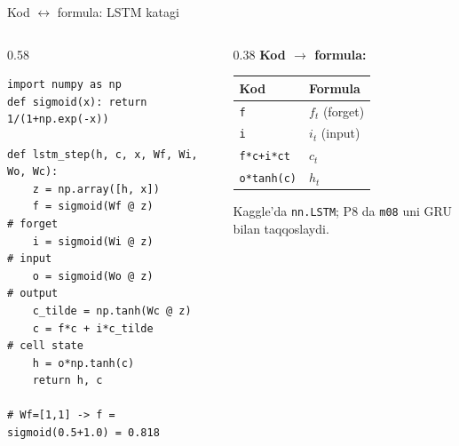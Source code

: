 \documentclass[aspectratio=169,11pt]{beamer}
\begin{document}
\begin{frame}[fragile]{Kod $\leftrightarrow$ formula: LSTM katagi}
  \begin{columns}[T]
    \begin{column}{0.58\textwidth}
\begin{lstlisting}
import numpy as np
def sigmoid(x): return 1/(1+np.exp(-x))

def lstm_step(h, c, x, Wf, Wi, Wo, Wc):
    z = np.array([h, x])
    f = sigmoid(Wf @ z)            # forget
    i = sigmoid(Wi @ z)            # input
    o = sigmoid(Wo @ z)            # output
    c_tilde = np.tanh(Wc @ z)
    c = f*c + i*c_tilde            # cell state
    h = o*np.tanh(c)
    return h, c

# Wf=[1,1] -> f = sigmoid(0.5+1.0) = 0.818
\end{lstlisting}
    \end{column}
    \begin{column}{0.38\textwidth}
      \textbf{Kod $\to$ formula:}\\[3pt]
      \footnotesize
      \begin{tabular}{p{1.6cm}p{2.0cm}}
        \toprule
        Kod & Formula \\
        \midrule
        \texttt{f} & $f_t$ (forget) \\
        \texttt{i} & $i_t$ (input) \\
        \texttt{f*c+i*ct} & $c_t$ \\
        \texttt{o*tanh(c)} & $h_t$ \\
        \bottomrule
      \end{tabular}
      \vspace{4pt}
      \begin{tcolorbox}[okbox,top=2pt,bottom=2pt]
        \footnotesize
        Kaggle'da \texttt{nn.LSTM}; P8 da \texttt{m08} uni GRU bilan taqqoslaydi.
      \end{tcolorbox}
    \end{column}
  \end{columns}
\end{frame}
\end{document}
